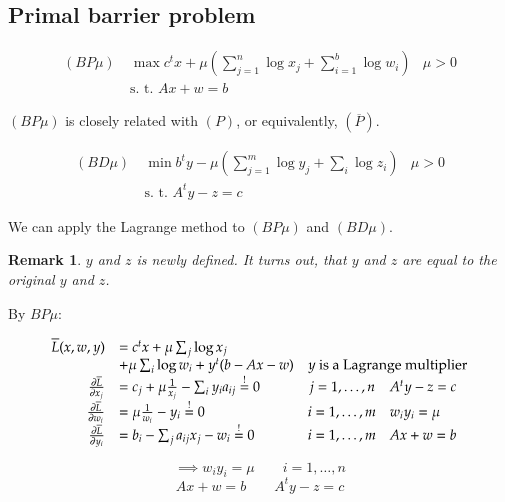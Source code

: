 \documentclass[a4paper]{article}
\numberwithin{lecref}{subsection}
\newtheorem*{Remark}{Remark}
\begin{document}
\subsection{Primal barrier problem}

\begin{align*}
	(BP\mu) \: &\max c^t x + \mu \left(\sum_{j=1}^n \log x_j + \sum_{i=1}^b \log w_i\right) & \mu > 0 \\
    &\text{s. t. } Ax + w = b
\end{align*}

$(BP\mu)$ is closely related with $(P)$, or equivalently, $(\overline P)$. 

\begin{align*}
	(BD\mu) \: &\min b^t y - \mu \left(\sum_{j=1}^m \log y_j + \sum_i \log z_i\right) & \mu > 0 \\
	&\text{s. t. } A^t y - z = c
\end{align*}

We can apply the Lagrange method to $(BP\mu)$ and $(BD\mu)$.

\begin{Remark}
	$y$ and $z$ is newly defined. It turns out, that $y$ and $z$ are equal to the original $y$ and $z$.
\end{Remark}

By $BP\mu$:

\[
	\begin{array}{rlcl}
		\overline L(x, w, y) &= c^t x + \mu \sum_j \log x_j & & \\
			&+ \mu \sum_i \log w_i + y^t (b - Ax - w) & \multicolumn{2}{c}{y \text{ is a Lagrange multiplier}} \\
		\frac{\partial \overline L}{\partial x_j} &= c_j + \mu \frac{1}{x_j} - \sum_i y_i a_{ij} \overset!= 0 & j = 1, \dots, n & A^t y - z = c \\
		\frac{\partial \overline L}{\partial w_i} &= \mu \frac{1}{w_i} - y_i \overset!= 0 & i = 1, \dots, m & w_i y_i = \mu \\
		\frac{\partial \overline L}{\partial y_i} &= b_i - \sum_j a_{ij} x_j - w_i \overset!= 0 & i = 1, \dots, m & Ax + w = b
	\end{array}
\]

\[ \implies w_i y_i = \mu \qquad i = 1, \dots, n \]
\[ Ax + w = b \qquad A^t y - z = c \]
\end{document}
